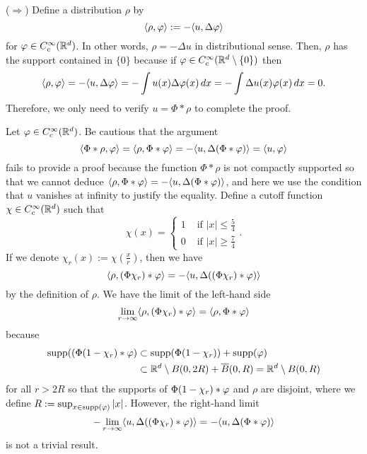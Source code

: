 \documentclass[12pt]{article}
\begin{document}
\begin{pf}
($\Rightarrow$)
Define a distribution $\rho$ by
\[\langle\rho,\varphi\rangle:=-\langle u,\Delta\varphi\rangle\]
for $\varphi\in C_c^\infty(\mathbb{R}^d)$.
In other words, $\rho=-\Delta u$ in distributional sense.
Then, $\rho$ has the support contained in $\{0\}$ because if $\varphi\in C_c^\infty(\mathbb{R}^d\setminus\{0\})$ then
\[\langle\rho,\varphi\rangle=-\langle u,\Delta \varphi\rangle=-\int u(x)\Delta\varphi(x)\,dx=-\int\Delta u(x)\varphi(x)\,dx=0.\]
Therefore, we only need to verify $u=\Phi*\rho$ to complete the proof.

Let $\varphi\in C_c^\infty(\mathbb{R}^d)$.
Be cautious that the argument
\[\langle\Phi*\rho,\varphi\rangle=\langle\rho,\Phi*\varphi\rangle=-\langle u,\Delta(\Phi*\varphi)\rangle=\langle u,\varphi\rangle\]
fails to provide a proof because the function $\Phi*\rho$ is not compactly supported so that we cannot deduce $\langle\rho,\Phi*\varphi\rangle=-\langle u,\Delta(\Phi*\varphi)\rangle$, and here we use the condition that $u$ vanishes at infinity to justify the equality.
Define a cutoff function $\chi\in C_c^\infty(\mathbb{R}^d)$ such that
\[\chi(x)=\begin{cases}1&\text{ if }|x|\le\frac54\\0&\text{ if }|x|\ge\frac74\end{cases}.\]
If we denote $\chi_r(x):=\chi(\frac xr)$, then we have
\[\langle\rho,(\Phi\chi_r)*\varphi\rangle=-\langle u,\Delta((\Phi\chi_r)*\varphi)\rangle\]
by the definition of $\rho$.
We have the limit of the left-hand side
\[\lim_{r\to\infty}\langle\rho,(\Phi\chi_r)*\varphi\rangle=\langle\rho,\Phi*\varphi\rangle\]
because
\begin{align*}
\operatorname{supp}((\Phi(1-\chi_r)*\varphi)&\subset\operatorname{supp}(\Phi(1-\chi_r))+\operatorname{supp}(\varphi)\\
&\subset\mathbb{R}^d\setminus B(0,2R)+\overline B(0,R)=\mathbb{R}^d\setminus B(0,R)
\end{align*}
for all $r>2R$ so that the supports of $\Phi(1-\chi_r)*\varphi$ and $\rho$ are disjoint, where we define $R:=\sup_{x\in\operatorname{supp}(\varphi)}|x|$.
However, the right-hand limit
\[-\lim_{r\to\infty}\langle u,\Delta((\Phi\chi_r)*\varphi)\rangle=-\langle u,\Delta(\Phi*\varphi)\rangle\]
is not a trivial result.


\end{pf}
\end{document}
